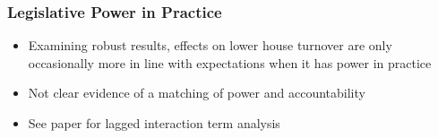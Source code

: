 \documentclass{beamer}
\begin{document}
    \begin{frame}
        \frametitle{Legislative Power in Practice}
        \begin{itemize}
            \item Examining robust results, effects on lower house turnover are only occasionally more in line with expectations when it has power in practice
            \item Not clear evidence of a matching of power and accountability
            \item See paper for lagged interaction term analysis
        \end{itemize}
    \end{frame}
\end{document}
